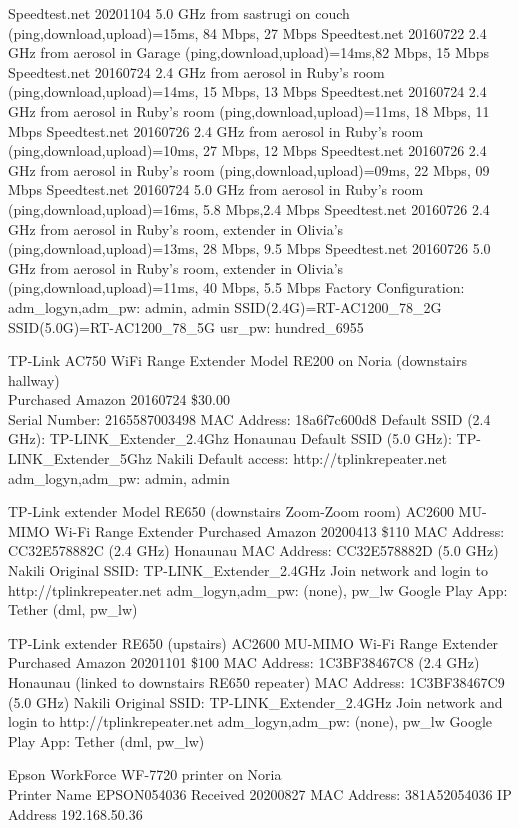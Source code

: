 \documentclass[12pt,twoside]{article}
\begin{document}
Speedtest.net 20201104 5.0 GHz from sastrugi on couch (ping,download,upload)=15ms, 84 Mbps, 27 Mbps
Speedtest.net 20160722 2.4 GHz from aerosol in Garage (ping,download,upload)=14ms,82 Mbps, 15 Mbps
Speedtest.net 20160724 2.4 GHz from aerosol in Ruby's room (ping,download,upload)=14ms, 15 Mbps, 13 Mbps
Speedtest.net 20160724 2.4 GHz from aerosol in Ruby's room (ping,download,upload)=11ms, 18 Mbps, 11 Mbps
Speedtest.net 20160726 2.4 GHz from aerosol in Ruby's room (ping,download,upload)=10ms, 27 Mbps, 12 Mbps
Speedtest.net 20160726 2.4 GHz from aerosol in Ruby's room (ping,download,upload)=09ms, 22 Mbps, 09 Mbps
Speedtest.net 20160724 5.0 GHz from aerosol in Ruby's room (ping,download,upload)=16ms, 5.8 Mbps,2.4 Mbps
Speedtest.net 20160726 2.4 GHz from aerosol in Ruby's room, extender in Olivia's (ping,download,upload)=13ms, 28 Mbps, 9.5 Mbps
Speedtest.net 20160726 5.0 GHz from aerosol in Ruby's room, extender in Olivia's (ping,download,upload)=11ms, 40 Mbps, 5.5 Mbps
Factory Configuration:
adm\_logyn,adm\_pw: admin, admin
SSID(2.4G)=RT-AC1200\_78\_2G
SSID(5.0G)=RT-AC1200\_78\_5G
usr\_pw: hundred\_6955

TP-Link AC750 WiFi Range Extender Model RE200 on Noria (downstairs hallway)\\
Purchased Amazon 20160724 \$30.00\\
Serial Number: 2165587003498
MAC Address: 18a6f7c600d8
Default SSID (2.4 GHz): TP-LINK\_Extender\_2.4Ghz Honaunau
Default SSID (5.0 GHz): TP-LINK\_Extender\_5Ghz Nakili
Default access:
http://tplinkrepeater.net
adm\_logyn,adm\_pw: admin, admin

TP-Link extender Model RE650 (downstairs Zoom-Zoom room)
AC2600 MU-MIMO Wi-Fi Range Extender
Purchased Amazon 20200413 \$110
MAC Address: CC32E578882C (2.4 GHz) Honaunau
MAC Address: CC32E578882D (5.0 GHz) Nakili
Original SSID: TP-LINK_Extender_2.4GHz
Join network and login to http://tplinkrepeater.net
adm\_logyn,adm\_pw: (none), pw\_lw
Google Play App: Tether (dml, pw_lw)

TP-Link extender RE650 (upstairs)
AC2600 MU-MIMO Wi-Fi Range Extender
Purchased Amazon 20201101 \$100
MAC Address:  1C3BF38467C8 (2.4 GHz) Honaunau (linked to downstairs RE650 repeater)
MAC Address:  1C3BF38467C9 (5.0 GHz) Nakili
Original SSID: TP-LINK_Extender_2.4GHz
Join network and login to http://tplinkrepeater.net
adm\_logyn,adm\_pw: (none), pw\_lw
Google Play App: Tether (dml, pw_lw)

Epson WorkForce WF-7720 printer on Noria\\
Printer Name EPSON054036
Received 20200827
MAC Address: 381A52054036
IP Address 192.168.50.36
\end{document}
